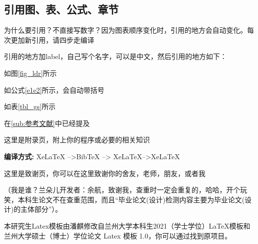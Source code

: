 \documentclass[AutoFakeBold]{template/LZUThesis2021_master}
\begin{document}
\subsection{引用图、表、公式、章节} %

为什么要引用？不直接写数字？因为图表顺序变化时，引用的地方会自动变化。每次更加新引用，请四步走编译

引用的地方加label，自己写个名字，可以是中文，然后引用的地方如下：

如图\ref{fig_ldr}所示

如公式\eqref{e1e2}所示，会自动带括号

如表\ref{tbl_gs}所示

在\ref{sub:参考文献}中已经提及


\backmatter


\printbib



\Appendix


这里是附录页，附上你的程序或必要的相关知识

{\bfseries 编译方式:} XeLaTeX -->BibTeX --> XeLaTeX-->XeLaTeX


\Thanks

这里是致谢页，你可以在这里致谢你的舍友，老师，朋友，或者我

（我是谁？兰朵儿开发者：余航，致谢我，查重时一定会重复的，哈哈，开个玩笑，本科生论文不在查重范围，而且“毕业论文(设计)检测内容主要为毕业论文(设计)的主体部分”）。

本研究生Latex模板由潘麒修改自兰州大学本科生2021（学士学位）LaTeX模板和兰州大学硕士（博士）学位论文 Latex 模板 1.0，你可以通过\cite{yuhldrlzuthesis2020,JChrysanthemum}找到原项目。
\end{document}
